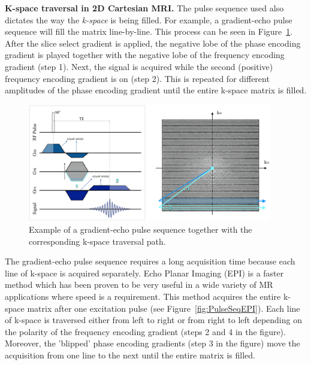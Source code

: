 \hfill

\textbf{K-space traversal in 2D Cartesian MRI.}
The pulse sequence used also dictates the way the \textit{k-space} is being filled.
For example, a gradient-echo pulse sequence will fill the matrix line-by-line.
This process can be seen in Figure~\ref{fig:PulseSeqGE}. 
After the slice select gradient is applied, the negative lobe of the phase encoding gradient is played together with the negative lobe of the frequency encoding gradient (step 1).
Next, the signal is acquired while the second (positive) frequency encoding gradient is on (step 2).
This is repeated for different amplitudes of the phase encoding gradient until the entire k-space matrix is filled.

\begin{figure}[ht]
    \centering
    \includegraphics[width=0.95\textwidth,keepaspectratio]{images/mri/PulseSeqGE}
    \caption{Example of a gradient-echo pulse sequence together with the corresponding k-space traversal path.}
    \label{fig:PulseSeqGE}
\end{figure}

The gradient-echo pulse sequence requires a long acquisition time because each line of k-space is acquired separately. 
Echo Planar Imaging (EPI) is a faster method which has been proven to be very useful in a wide variety of MR applications where speed is a requirement.
This method acquires the entire k-space matrix after one excitation pulse (see Figure~\ref{fig:PulseSeqEPI}).
Each line of k-space is traversed either from left to right or from right to left depending on the polarity of the frequency encoding gradient (steps 2 and 4 in the figure).
Moreover, the 'blipped' phase encoding gradients (step 3 in the figure) move the acquisition from one line to the next until the entire matrix is filled.

